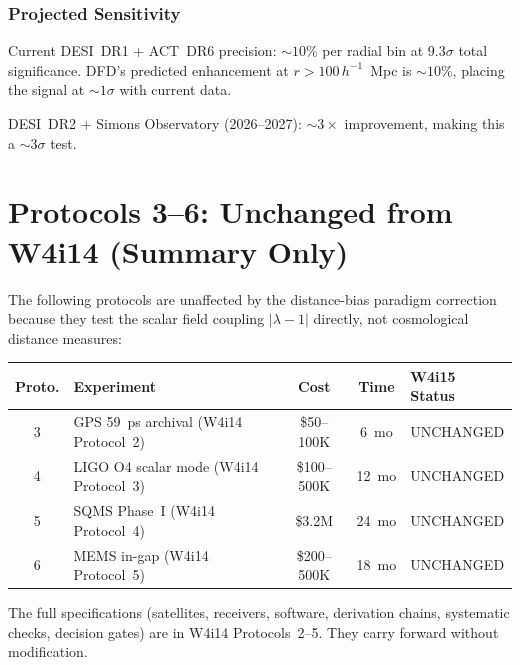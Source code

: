 \documentclass[11pt]{article}
\begin{document}
\section{Projected Sensitivity}

Current DESI~DR1 + ACT~DR6 precision: $\sim 10\%$ per radial bin at
$9.3\sigma$ total significance. DFD's predicted enhancement at
$r > 100\,h^{-1}$~Mpc is $\sim 10\%$, placing the signal at
$\sim 1\sigma$ with current data.

DESI~DR2 + Simons Observatory (2026--2027): $\sim 3\times$ improvement,
making this a $\sim 3\sigma$ test.


\part{Protocols 3--6: Unchanged from W4i14 (Summary Only)}
\label{part:unchanged}

The following protocols are unaffected by the distance-bias paradigm
correction because they test the scalar field coupling $|\lambda - 1|$
directly, not cosmological distance measures:

\begin{center}
\renewcommand{\arraystretch}{1.3}
\begin{tabular}{@{}clccl@{}}
\toprule
\textbf{Proto.} & \textbf{Experiment} & \textbf{Cost} &
  \textbf{Time} & \textbf{W4i15 Status} \\
\midrule
3 & GPS 59~ps archival (W4i14 Protocol~2) & \$50--100K & 6~mo &
  UNCHANGED \\
4 & LIGO O4 scalar mode (W4i14 Protocol~3) & \$100--500K & 12~mo &
  UNCHANGED \\
5 & SQMS Phase~I (W4i14 Protocol~4) & \$3.2M & 24~mo &
  UNCHANGED \\
6 & MEMS in-gap (W4i14 Protocol~5) & \$200--500K & 18~mo &
  UNCHANGED \\
\bottomrule
\end{tabular}
\end{center}

The full specifications (satellites, receivers, software, derivation
chains, systematic checks, decision gates) are in W4i14 Protocols~2--5.
They carry forward without modification.
\end{document}
